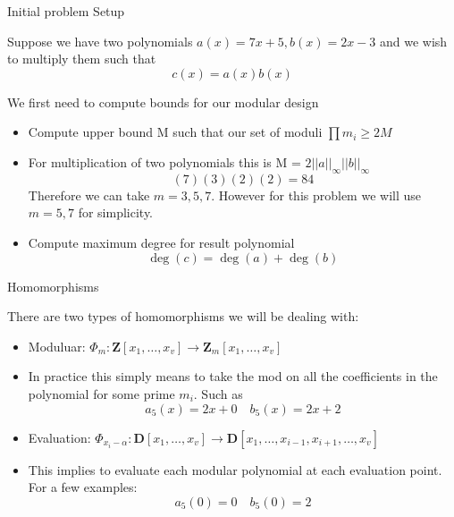 \documentclass{beamer}
\begin{document}
	
	\begin{frame}{Initial problem Setup}
		
		Suppose we have two polynomials $a(x) = 7x+5,b(x)=2x-3$ and we wish to multiply them  such that
		$$ c(x) = a(x)b(x)$$
		
		We first need to compute bounds for our modular design
		
		\begin{itemize}
			\item Compute upper bound M such that our set of moduli $\prod{m_i} \geq 2M$\\
			\item For multiplication of two polynomials this is M = $2||a||_\infty ||b||_\infty$\\
				$$(7)(3)(2)(2) = 84$$
			Therefore we can take $m = 3,5,7$. However for this problem we will use $m=5,7$ for simplicity.
			\item Compute maximum degree for result polynomial $$\deg (c) = \deg (a) + \deg (b)$$
		\end{itemize}
	\end{frame}
	
	\begin{frame}{Homomorphisms}
		
		
		
		There are two types of homomorphisms we will be dealing with:
		
		\begin{itemize}
			\item Moduluar: $\Phi_m : \mathbf{Z}[x_1,\dots,x_v] \rightarrow \mathbf{Z}_m[x_1,\dots,x_v ]$ \\
			\item In practice this simply means to take the mod on all the coefficients in the polynomial for some prime $m_i$. Such as
			$$a_5(x) = 2x+0 \quad b_5(x)  = 2x + 2$$
			\item Evaluation: $\Phi_{x_i-\alpha} : \mathbf{D}[x_1,\dots,x_v] \rightarrow \mathbf{D}[x_1,\dots,x_{i-1},x_{i+1},\dots,x_v]$
			\item This implies to evaluate each modular polynomial at each evaluation point. For a few examples:
			$$a_5(0) = 0 \quad b_5(0) = 2$$		
			
		
		\end{itemize}
					
	\end{frame}
	
\end{document}

